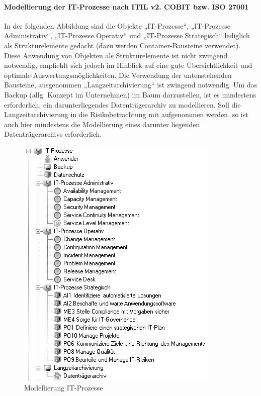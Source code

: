 \paragraph{Modellierung der IT-Prozesse nach ITIL v2. COBIT bzw. ISO 27001}
In der folgenden Abbildung sind die Objekte „IT-Prozesse“, „IT-Prozesse Administrativ“, „IT-Prozesse Operativ“ und „IT-Prozesse Strategisch“ lediglich als Strukturelemente gedacht (dazu werden Container-Bausteine verwendet). Diese Anwendung von Objekten als Strukturelemente ist nicht zwingend notwendig, empfiehlt sich jedoch im Hinblick auf eine gute Übersichtlichkeit und optimale Auswertungsmöglichkeiten. Die Verwendung der untenstehenden Bausteine, ausgenommen „Langzeitarchivierung“ ist zwingend notwendig.
Um das Backup (allg. Konzept im Unternehmen) im Baum darzustellen, ist es mindestens erforderlich, ein darunterliegendes Datenträgerarchiv zu modellieren.
Soll die Langzeitarchivierung in die Risikobetrachtung mit aufgenommen werden, so ist auch hier mindestens die Modellierung eines darunter liegenden Datenträgerarchivs erforderlich.
\begin{figure}[htbp]
	\centering
	\includegraphics[scale =1 ]{images/prozesse.png}
	\caption{Modellierung IT-Prozesse}
	\label{fig:prozesse}
\end{figure}

